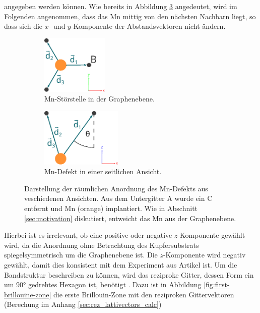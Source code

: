 angegeben werden können.
Wie bereits in Abbildung \ref{fig:mangan_impurity} angedeutet, wird im Folgenden angenommen, dass das Mn mittig von den nächsten Nachbarn liegt, so dass 
sich die $x$- und $y$-Komponente der Abstandsvektoren nicht ändern.
\begin{figure}
    \begin{subfigure}{0.48\textwidth}%
    \centering%
    \includegraphics[height = 2.8cm]{Plots/mangan_impurity_inplane.pdf}%
    \caption{Mn-Störstelle in der Graphenebene.}%
    \label{fig:mangan_impurity_inplane}%
    \end{subfigure}%
    \hfill%
    \begin{subfigure}{0.48\textwidth}%
    \centering%
    \includegraphics[height = 2.8cm]{Plots/mangan_impurity_z_component.pdf}%
    \caption{Mn-Defekt in einer seitlichen Ansicht.}%
    \label{fig:mangan_impurity_z_component}%
    \end{subfigure}%
    \caption{Darstellung der räumlichen Anordnung des Mn-Defekts aus veschiedenen Ansichten.
    Aus dem Untergitter A wurde ein C entfernt und Mn (orange) implantiert.
    Wie in Abschnitt \ref{sec:motivation} diskutiert, entweicht das Mn aus der Graphenebene.}%
    \label{fig:mangan_impurity}%
\end{figure}%
Hierbei ist es irrelevant, ob eine positive oder negative $z$-Komponente gewählt wird, da die Anordnung ohne Betrachtung des Kupfersubstrats 
spiegelsymmetrisch um die Graphenebene ist. 
Die $z$-Komponente wird negativ gewählt, damit dies konsistent mit dem Experiment aus Artikel \cite{doi:10.1021/acsnano.1c00139} ist.
Um die Bandstruktur beschreiben zu können, wird das reziproke Gitter, 
dessen Form ein um $\ang{90;;}$ gedrehtes Hexagon ist, benötigt \cite{honey}.
Dazu ist in Abbildung \ref{fig:first-brillouine-zone} die erste Brillouin-Zone mit den 
reziproken Gittervektoren (Berechung im Anhang \ref{sec:rez_lattivectors_calc})
